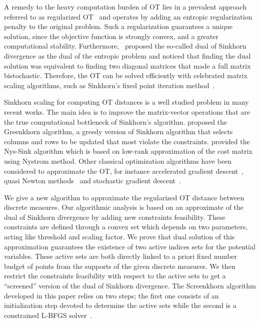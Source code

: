 \documentclass{article}
\begin{document}
A remedy to the heavy computation burden of OT lies in a prevalent approach referred to as regularized OT~\cite{cuturinips13} and operates by adding an entropic regularization penalty to the original problem.  
Such a regularization guarantees a unique solution, since the objective function is strongly convex, and a greater computational stability.
Furthermore,~\cite{cuturinips13} proposed the so-called {dual of Sinkhorn divergence} as the dual of the entropic problem and noticed that finding the dual solution was equivalent to finding two diagonal matrices that made a full matrix bistochastic.
Therefore, the OT can be solved efficiently with celebrated matrix scaling algorithms, such as Sinkhorn's fixed point iteration method~\cite{sinkhorn1967,knight2008,kalantari2008}. 


Sinkhorn scaling for computing OT distances is a well studied problem in many recent works. 
The main idea is to improve the matrix-vector operations that are the true computational bottleneck of Sinkhorn’s algorithm. 
\cite{altschulernips17} proposed the Greenkhorn algorithm, a greedy version of Sinkhorn algorithm that selects columns and rows to be updated that most violate the constraints.
\cite{altschuler2018Nystrom} provided the Nys-Sink algorithm which is based on low-rank approximation of the cost matrix using Nystrom method.
Other classical optimization algorithms have been considered to approximate the OT, for instance accelerated gradient descent~\cite{dvurechensky18aICML,lin2019}, quasi Newton methods~\cite{blondel2018ICML,cuturi2016SIAM} and stochastic gradient descent~\cite{genevay2016stochOT,khalilabid2018}. 


We give a new algorithm to approximate the regularized OT distance between discrete measures. 
Our algorithmic analysis is based on an approximate of the dual of Sinkhorn divergence by adding new constraints feasibility. 
These constraints are defined through a convex set which depends on two parameters, acting like threshold and scaling factor.
We prove that dual solution of this approximation guarantees the existence of two active indices sets for the potential variables.
These active sets are both directly linked to a priori fixed number budget of points from the supports of the given discrete measures.
We then restrict the constraints feasibility with respect to the active sets to get a ``screened'' version of the dual of Sinkhorn divergence. 
The Screenkhorn algorithm developed in this paper relies on two steps; the first one consists of an initialization step devoted to determine the active sets while the second is a constrained L-BFGS solver~\cite{zhu1997-LBFGS,cuturi2016SIAM,blondel2018ICML}. 
\end{document}

